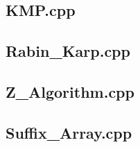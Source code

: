 \subsection{KMP.cpp}

\subsection{Rabin\_Karp.cpp}

\subsection{Z\_Algorithm.cpp}

\subsection{Suffix\_Array.cpp}

